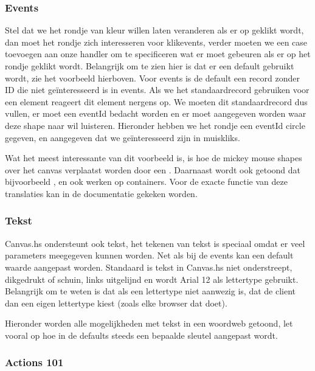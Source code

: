 \subsubsection{Events}
Stel dat we het rondje van kleur willen laten veranderen als er op geklikt wordt, dan moet het rondje zich interesseren voor klikevents, verder moeten we een case toevoegen aan onze handler om te specificeren wat er moet gebeuren als er op het rondje geklikt wordt. Belangrijk om te zien hier is dat er een default gebruikt wordt, zie het voorbeeld hierboven. Voor events is de default een record zonder ID die niet ge\"interesseerd is in events. Als we het standaardrecord gebruiken voor een element reageert dit element nergens op. We moeten dit standaardrecord dus vullen, er moet een eventId bedacht worden en er moet aangegeven worden waar deze shape naar wil luisteren. Hieronder hebben we het rondje een eventId circle gegeven, en aangegeven dat we ge\"interesseerd zijn in muiskliks.



Wat het meest interessante van dit voorbeeld is, is hoe de mickey mouse shapes over het canvas verplaatst worden door een . Daarnaast wordt ook getoond dat bijvoorbeeld ,  en  ook werken op containers. Voor de exacte functie van deze translaties kan in de documentatie gekeken worden. 

\subsubsection{Tekst}

Canvas.hs ondersteunt ook tekst, het tekenen van tekst is speciaal omdat er veel parameters meegegeven kunnen worden. Net als bij de events kan een default waarde aangepast worden. Standaard is tekst in Canvas.hs niet onderstreept, dikgedrukt of schuin, links uitgelijnd en wordt Arial 12 als lettertype gebruikt. Belangrijk om te weten is dat als een lettertype niet aanwezig is, dat de client dan een eigen lettertype kiest (zoals elke browser dat doet).

Hieronder worden alle mogelijkheden met tekst in een woordweb getoond, let vooral op hoe in de defaults steeds een bepaalde sleutel aangepast wordt.


\subsubsection{Actions 101}

